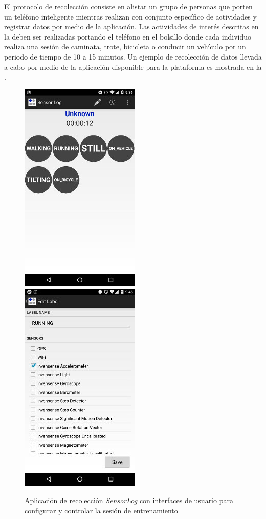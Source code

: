 El protocolo de recolección consiste en alistar un grupo de personas
que porten un teléfono inteligente mientras realizan con conjunto
específico de actividades y registrar datos por medio de la aplicación.
Las actividades de interés descritas en la 
deben ser realizadas portando el teléfono en el bolsillo donde cada
individuo realiza una sesión de caminata, trote, bicicleta o conducir
un vehículo por un periodo de tiempo de 10 a 15 minutos. Un ejemplo
de recolección de datos llevada a cabo por medio de la aplicación
disponible para la plataforma  es mostrada en la . 

\begin{figure}[!tbph]
\begin{centering}
\includegraphics[scale=0.8]{capitulo-4/graphics/sensorlog1}\includegraphics[scale=0.8]{capitulo-4/graphics/sensorlog2}
\par\end{centering}
\caption[Aplicación de recolección \emph{SensorLog}]{\label{fig4:sensor-log}Aplicación de recolección \emph{SensorLog
}con interfaces de usuario para configurar y controlar la sesión de
entrenamiento}
\end{figure}

